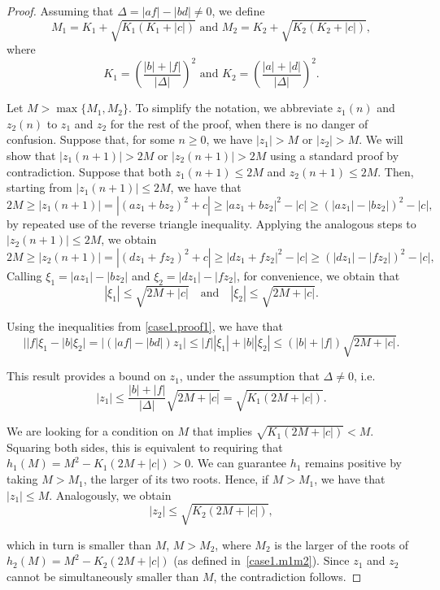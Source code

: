 \documentclass[10pt]{article}
\begin{document}
\begin{proof}
Assuming that $\Delta = |af | - |bd | \neq 0$, we define
\begin{equation} \label{case1.m1m2}
M_1 = K_1 + \sqrt{K_1 (K_1 + |c|)}
\text{ and }
M_2 = K_2 + \sqrt{K_2(K_2 + |c|)},
\end{equation}
where
\[
K_1 = \left(\frac{|b| + |f|}{|\Delta|}\right)^2
\text{ and }
K_2 = \left(\frac{|a| + |d|}{|\Delta|}\right)^2.
\]

Let $M > \max\{M_1, M_2\}$. To simplify the notation, we abbreviate $z_1(n)$ and $z_2(n)$ to $z_1$ and $z_2$ for the rest of the proof, when there is no danger of confusion. Suppose that, for some $n \geq 0$, we have $|z_1| > M$ or $|z_2| > M$. We will show that $|z_1(n + 1)| > 2 M$ or $|z_2(n + 1)| > 2 M$ using a standard proof by contradiction. Suppose that both $z_1(n + 1) \leq 2M$ and $z_2(n + 1) \leq 2M$. Then, starting from $|z_1(n + 1)| \le 2 M$, we have that
\[
2 M
\geq |z_1(n + 1)| = |(a z_1 + b z_2)^2 + c|
\geq |a z_1 + b z_2|^2 - |c|
\geq (|a z_1| - |b z_2|)^2 - |c|,
\]
by repeated use of the reverse triangle inequality. Applying the analogous steps to $|z_2(n + 1)| \le 2 M$, we obtain
\[
2 M
\geq |z_2(n + 1)| = |(d z_1 + f z_2)^2 + c|
\geq |d z_1 + f z_2|^2 - |c|
\geq (|d z_1| - |f z_2|)^2 - |c|,
\]
Calling $\xi_1=|a z_1| - |b z_2|$ and $\xi_2 = |d z_1| - |f z_2|$, for convenience, we obtain that
\begin{equation} \label{case1.proof1}
    |\xi_1| \leq \sqrt{2M + |c|}
    \quad \text{and} \quad
    |\xi_2| \leq \sqrt{2M + |c|}.
\end{equation}

Using the inequalities from \eqref{case1.proof1}, we have that
\begin{equation*}
\big||f| \xi_1 - |b| \xi_2\big|
    = \big|(|a f| - |b d|) z_1\big|
    \leq |f| |\xi_1| + |b| |\xi_2|
    \leq (|b| + |f|) \sqrt{2M + |c|}.
\end{equation*}

This result provides a bound on $z_1$, under the assumption that $\Delta \ne 0$, i.e.
\begin{equation} \label{ineq_z1}
|z_1| \leq \frac{|b| + |f|}{|\Delta|} \sqrt{2 M + |c|} = \sqrt{K_1 (2 M + |c|)}.
\end{equation}

We are looking for a condition on $M$ that implies
$\sqrt{K_1 (2 M + |c|)} < M$. Squaring both sides, this is equivalent to requiring that $h_1(M) = M^2 - K_1 (2 M +|c|) > 0$. We can guarantee $h_1$ remains positive by taking $M > M_1$, the larger of its two roots. Hence, if $M>M_1$, we have that $|z_1| \leq M$. Analogously, we obtain
\begin{equation*}
   |z_2| \leq \sqrt{K_2 (2 M + |c|)},
\end{equation*}

which in turn is smaller than $M$, $M > M_2$, where $M_2$ is the larger of the roots of $h_2(M) = M^2 - K_2 (2 M + |c|)$ (as defined in~\eqref{case1.m1m2}). Since $z_1$ and $z_2$ cannot be simultaneously smaller than $M$, the contradiction follows.
\end{proof}
\end{document}
